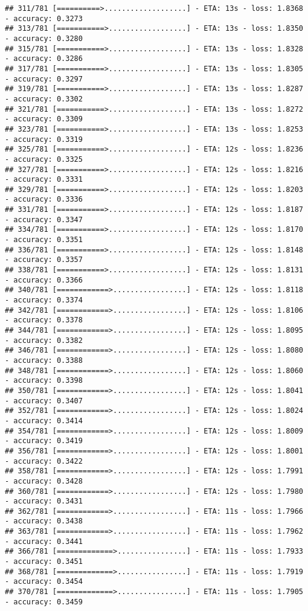 \documentclass[
]{article}
\begin{document}
\begin{verbatim}
## 311/781 [==========>...................] - ETA: 13s - loss: 1.8368 - accuracy: 0.3273
## 313/781 [===========>..................] - ETA: 13s - loss: 1.8350 - accuracy: 0.3280
## 315/781 [===========>..................] - ETA: 13s - loss: 1.8328 - accuracy: 0.3286
## 317/781 [===========>..................] - ETA: 13s - loss: 1.8305 - accuracy: 0.3297
## 319/781 [===========>..................] - ETA: 13s - loss: 1.8287 - accuracy: 0.3302
## 321/781 [===========>..................] - ETA: 13s - loss: 1.8272 - accuracy: 0.3309
## 323/781 [===========>..................] - ETA: 13s - loss: 1.8253 - accuracy: 0.3319
## 325/781 [===========>..................] - ETA: 12s - loss: 1.8236 - accuracy: 0.3325
## 327/781 [===========>..................] - ETA: 12s - loss: 1.8216 - accuracy: 0.3331
## 329/781 [===========>..................] - ETA: 12s - loss: 1.8203 - accuracy: 0.3336
## 331/781 [===========>..................] - ETA: 12s - loss: 1.8187 - accuracy: 0.3347
## 334/781 [===========>..................] - ETA: 12s - loss: 1.8170 - accuracy: 0.3351
## 336/781 [===========>..................] - ETA: 12s - loss: 1.8148 - accuracy: 0.3357
## 338/781 [===========>..................] - ETA: 12s - loss: 1.8131 - accuracy: 0.3366
## 340/781 [============>.................] - ETA: 12s - loss: 1.8118 - accuracy: 0.3374
## 342/781 [============>.................] - ETA: 12s - loss: 1.8106 - accuracy: 0.3378
## 344/781 [============>.................] - ETA: 12s - loss: 1.8095 - accuracy: 0.3382
## 346/781 [============>.................] - ETA: 12s - loss: 1.8080 - accuracy: 0.3388
## 348/781 [============>.................] - ETA: 12s - loss: 1.8060 - accuracy: 0.3398
## 350/781 [============>.................] - ETA: 12s - loss: 1.8041 - accuracy: 0.3407
## 352/781 [============>.................] - ETA: 12s - loss: 1.8024 - accuracy: 0.3414
## 354/781 [============>.................] - ETA: 12s - loss: 1.8009 - accuracy: 0.3419
## 356/781 [============>.................] - ETA: 12s - loss: 1.8001 - accuracy: 0.3422
## 358/781 [============>.................] - ETA: 12s - loss: 1.7991 - accuracy: 0.3428
## 360/781 [============>.................] - ETA: 12s - loss: 1.7980 - accuracy: 0.3431
## 362/781 [============>.................] - ETA: 11s - loss: 1.7966 - accuracy: 0.3438
## 363/781 [============>.................] - ETA: 11s - loss: 1.7962 - accuracy: 0.3441
## 366/781 [=============>................] - ETA: 11s - loss: 1.7933 - accuracy: 0.3451
## 368/781 [=============>................] - ETA: 11s - loss: 1.7919 - accuracy: 0.3454
## 370/781 [=============>................] - ETA: 11s - loss: 1.7905 - accuracy: 0.3459

\end{verbatim}
\end{document}
